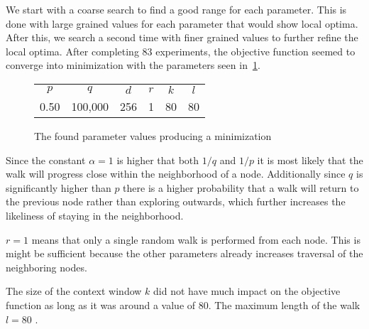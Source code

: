We start with a coarse search to find a good range for each parameter. This is done with large grained values for each parameter that would show local optima. After this, we search a second time with finer grained values to further refine the local optima. After completing 83 experiments, the objective function seemed to converge into minimization with the parameters seen in~\cref{tab:paramopt_goodvalues}.

\begin{figure}%
\centering
\begin{tabular}{cccccc}
\toprule
$p$  & $q$     & $d$ & $r$ & $k$ & $l$ \\
0.50 & 100,000 & 256 & 1   & 80  & 80 \\
\bottomrule
\end{tabular}
\caption[The found parameter values producing a minimization]{The found parameter values producing a minimization }%
\label{tab:paramopt_goodvalues}%
\end{figure}


Since the constant $\alpha = 1$ is higher that both $1/q$ and $1/p$ it is most likely that the walk will progress close within the neighborhood of a node. Additionally since $q$ is significantly higher than $p$ there is a higher probability that a walk will return to the previous node rather than exploring outwards, which further increases the likeliness of staying in the neighborhood.

$r=1$ means that only a single random walk is performed from each node. This is might be sufficient because the other parameters already increases traversal of the neighboring nodes.

The size of the context window $k$ did not have much impact on the objective function as long as it was around a value of 80. The maximum length of the walk $l=80$ .

